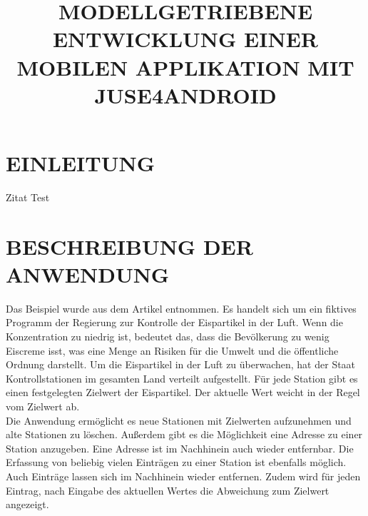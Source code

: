 \documentclass[a4paper,twoside]{article}
\begin{document}
\title{\uppercase{Modellgetriebene Entwicklung einer mobilen Applikation mit JUSE4Android}}

\author{
}




\onecolumn \maketitle \normalsize \vfill

\section{\uppercase{Einleitung}}
\label{sec:introduction}
\noindent Zitat Test
\cite{SilvaMasterThesis}

\section{\uppercase{Beschreibung der Anwendung}}
\noindent
Das Beispiel wurde aus dem Artikel \cite{Gui06} entnommen. Es handelt sich um ein fiktives Programm der Regierung zur Kontrolle der Eispartikel in der Luft. Wenn die Konzentration zu niedrig ist, bedeutet das, dass die Bevölkerung zu wenig Eiscreme isst, was eine Menge an Risiken für die Umwelt und die öffentliche Ordnung darstellt. Um die Eispartikel in der Luft zu überwachen, hat der Staat Kontrollstationen im gesamten Land verteilt aufgestellt. Für jede Station gibt es einen festgelegten Zielwert der Eispartikel. Der aktuelle Wert weicht in der Regel vom Zielwert ab. 
\\
Die Anwendung ermöglicht es neue Stationen mit Zielwerten aufzunehmen und alte Stationen zu löschen. Außerdem gibt es die Möglichkeit eine Adresse zu einer Station anzugeben. Eine Adresse ist im Nachhinein auch wieder entfernbar. Die Erfassung von beliebig vielen Einträgen zu einer Station ist ebenfalls möglich. Auch Einträge lassen sich im Nachhinein wieder entfernen. Zudem wird für jeden Eintrag, nach Eingabe des aktuellen Wertes die Abweichung zum Zielwert angezeigt.
\end{document}
